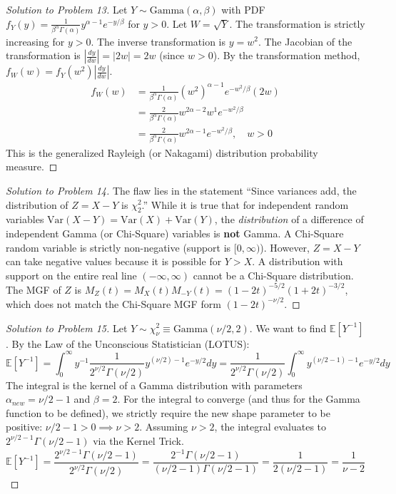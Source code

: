 \documentclass[11pt, a4paper]{article}
\theoremstyle{definition}
\theoremstyle{remark}
\newcommand{\E}{\mathbb{E}}
\begin{document}
\begin{proof}[Solution to Problem 13]
Let $Y \sim \text{Gamma}(\alpha, \beta)$ with PDF $f_Y(y) = \frac{1}{\beta^\alpha \Gamma(\alpha)} y^{\alpha-1} e^{-y/\beta}$ for $y > 0$.
Let $W = \sqrt{Y}$. The transformation is strictly increasing for $y > 0$. The inverse transformation is $y = w^2$.
The Jacobian of the transformation is $\left| \frac{dy}{dw} \right| = \left| 2w \right| = 2w$ (since $w > 0$).
By the transformation method, $f_W(w) = f_Y(w^2) \left| \frac{dy}{dw} \right|$.
\begin{align*}
f_W(w) &= \frac{1}{\beta^\alpha \Gamma(\alpha)} (w^2)^{\alpha-1} e^{-w^2/\beta} (2w) \\
&= \frac{2}{\beta^\alpha \Gamma(\alpha)} w^{2\alpha-2} w^1 e^{-w^2/\beta} \\
&= \frac{2}{\beta^\alpha \Gamma(\alpha)} w^{2\alpha-1} e^{-w^2/\beta}, \quad w > 0
\end{align*}
This is the generalized Rayleigh (or Nakagami) distribution probability measure.
\end{proof}

\begin{proof}[Solution to Problem 14]
The flaw lies in the statement ``Since variances add, the distribution of $Z = X - Y$ is $\chi^2_2$.''
While it is true that for independent random variables $\text{Var}(X - Y) = \text{Var}(X) + \text{Var}(Y)$, the \textit{distribution} of a difference of independent Gamma (or Chi-Square) variables is \textbf{not} Gamma.
A Chi-Square random variable is strictly non-negative (support is $[0, \infty)$). However, $Z = X - Y$ can take negative values because it is possible for $Y > X$. A distribution with support on the entire real line $(-\infty, \infty)$ cannot be a Chi-Square distribution. The MGF of $Z$ is $M_Z(t) = M_X(t)M_{-Y}(t) = (1-2t)^{-5/2}(1+2t)^{-3/2}$, which does not match the Chi-Square MGF form $(1-2t)^{-\nu/2}$.
\end{proof}

\begin{proof}[Solution to Problem 15]
Let $Y \sim \chi^2_\nu \equiv \text{Gamma}(\nu/2, 2)$. We want to find $\E[Y^{-1}]$.
By the Law of the Unconscious Statistician (LOTUS):
\[ \E[Y^{-1}] = \int_0^\infty y^{-1} \frac{1}{2^{\nu/2} \Gamma(\nu/2)} y^{(\nu/2)-1} e^{-y/2} dy = \frac{1}{2^{\nu/2} \Gamma(\nu/2)} \int_0^\infty y^{(\nu/2 - 1)-1} e^{-y/2} dy \]
The integral is the kernel of a Gamma distribution with parameters $\alpha_{new} = \nu/2 - 1$ and $\beta = 2$.
For the integral to converge (and thus for the Gamma function to be defined), we strictly require the new shape parameter to be positive: $\nu/2 - 1 > 0 \implies \nu > 2$.
Assuming $\nu > 2$, the integral evaluates to $2^{\nu/2 - 1} \Gamma(\nu/2 - 1)$ via the Kernel Trick.
\[ \E[Y^{-1}] = \frac{2^{\nu/2 - 1} \Gamma(\nu/2 - 1)}{2^{\nu/2} \Gamma(\nu/2)} = \frac{2^{-1} \Gamma(\nu/2 - 1)}{(\nu/2 - 1)\Gamma(\nu/2 - 1)} = \frac{1}{2(\nu/2 - 1)} = \frac{1}{\nu - 2} \]
\end{proof}
\end{document}
